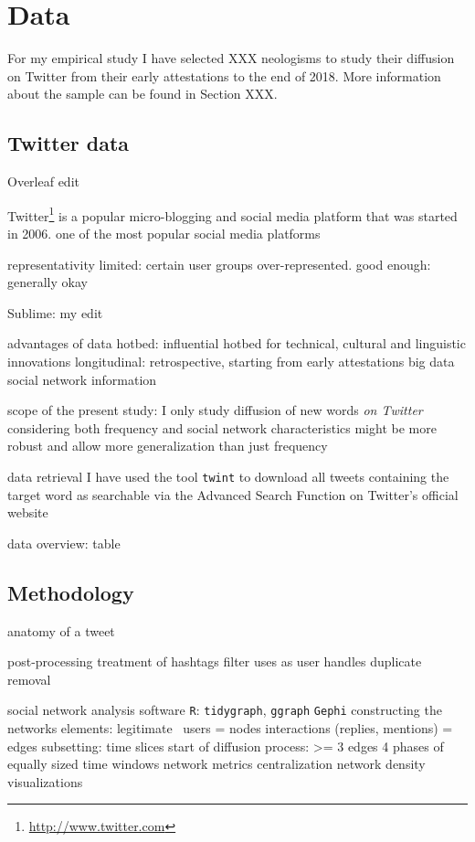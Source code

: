 \documentclass[a4paper, abstract=on]{scrartcl}
\newcommand{\sw}[1]{\texttt{#1}}
\begin{document}
\section{Data}

    For my empirical study I have selected XXX neologisms to study their diffusion on Twitter from their early attestations to the end of 2018. More information about the sample can be found in Section XXX.

  \subsection{Twitter data}
  
    Overleaf edit

    Twitter\footnote{\url{http://www.twitter.com}} is a popular micro-blogging and social media platform that was started in 2006.
      one of the most popular social media platforms

    representativity
      limited: certain user groups over-represented.
      good enough: generally okay \parencite{Grieve2019a}

    Sublime: my edit

    advantages of data
      hotbed: influential hotbed for technical, cultural and linguistic innovations
      longitudinal: retrospective, starting from early attestations
      big data
      social network information

    scope of the present study:
      I only study diffusion of new words \emph{on Twitter}
        considering both frequency and social network characteristics might be more robust and allow more generalization than just frequency

    data retrieval
      I have used the tool \sw{twint}
      to download all tweets containing the target word
      as searchable via the Advanced Search Function on Twitter's official website

    data overview: table

  \subsection{Methodology}

    anatomy of a tweet

    post-processing
      treatment of hashtags
      filter uses as user handles
      duplicate removal

    social network analysis
      software
        \sw{R}: \sw{tidygraph}, \sw{ggraph}
        \sw{Gephi}
      constructing the networks
        elements: legitimate~\parencite{Goel2016}
          users = nodes
          interactions (replies, mentions) = edges
        subsetting: time slices
            start of diffusion process: >= 3 edges
            4 phases of equally sized time windows
        network metrics
          centralization
          network density
        visualizations
\end{document}
